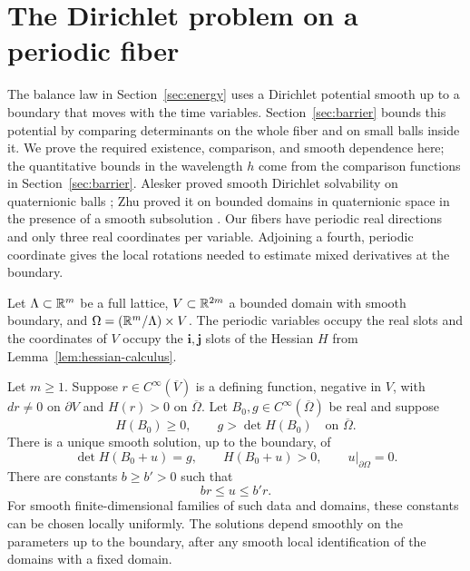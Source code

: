 \section{The Dirichlet problem on a periodic fiber}
\label{sec:dirichlet}

The balance law in Section~\ref{sec:energy} uses a Dirichlet potential
smooth up to a boundary that moves with the time variables.
Section~\ref{sec:barrier} bounds this potential by comparing
determinants on the whole fiber and on small balls inside it. We prove
the required existence, comparison, and smooth dependence here;
the quantitative bounds in the wavelength $h$ come from the
comparison functions in Section~\ref{sec:barrier}. Alesker proved smooth
Dirichlet solvability on quaternionic balls \cite[Theorem~1.4]{Alesker2003MA};
Zhu proved it on bounded domains in quaternionic space in the presence of
a smooth subsolution \cite[Theorem~1.1]{Zhu2016}. Our fibers have periodic
real directions and only three real coordinates per variable. Adjoining a
fourth, periodic coordinate gives the local rotations needed to estimate
mixed derivatives at the boundary.

Let $\Lambda\subset\mathbb R^m$ be a full lattice, $V\subset\mathbb R^{2m}$ a
bounded domain with smooth boundary, and
$\Omega=(\mathbb R^m/\Lambda)\times V$. The periodic variables occupy the
real slots and the coordinates of $V$ occupy the $\mathbf i,\mathbf j$
slots of the Hessian $H$ from Lemma~\ref{lem:hessian-calculus}.

\begin{theorem}\label{thm:dirichlet}
Let $m\ge1$. Suppose $r\in C^\infty(\overline V)$ is a defining
function, negative in $V$, with $dr\ne0$ on $\partial V$ and
$H(r)>0$ on $\overline\Omega$. Let $B_0,g\in C^\infty(\overline\Omega)$
be real and suppose
\[
 H(B_0)\ge0,\qquad g>\det H(B_0)\quad\text{on }\overline\Omega.
\]
There is a unique smooth solution, up to the boundary, of
\begin{equation}\label{eq:dirichlet-problem}
 \det H(B_0+u)=g,\qquad H(B_0+u)>0,\qquad
 u|_{\partial\Omega}=0.
\end{equation}
There are constants $b\ge b'>0$ such that
\begin{equation}\label{eq:dirichlet-barriers}
 br\le u\le b'r.
\end{equation}
For smooth finite-dimensional families of such data and domains, these
constants can be chosen locally uniformly. The solutions depend smoothly
on the parameters up to the boundary, after any smooth local
identification of the domains with a fixed domain.
\end{theorem}

